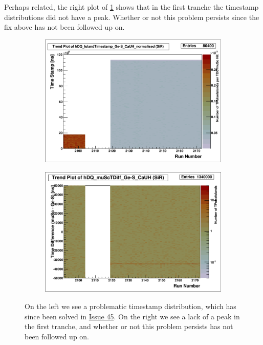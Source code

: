 \documentclass[a4paper]{article}
\newcommand{\issue}[1]{\href{https://github.com/alcap-org/AlcapDAQ/issues/#1}{Issue #1}}
\begin{document}
Perhaps related, the right plot of \ref{fig:sir_ges_timestamps} shows that in the first tranche the timestamp distributions did not
have a peak. Whether or not this problem persists since the fix above has not been followed up on.

\begin{figure}
  \centering
  \begin{subfigure}{0.5\textwidth}
    \includegraphics[width=0.9\linewidth]{figs/sir/ges_timestamp.png}
  \end{subfigure}%
  \begin{subfigure}{0.5\textwidth}
    \includegraphics[width=0.9\linewidth]{figs/sir/ges_tdiff}
  \end{subfigure}
  \caption{On the left we see a problematic timestamp distribution, which has since been solved in \issue{45}.
    On the right we see a lack of a peak in the first tranche, and whether or not this problem persists has not
    been followed up on.}
  \label{fig:sir_ges_timestamps}
\end{figure}
\end{document}
